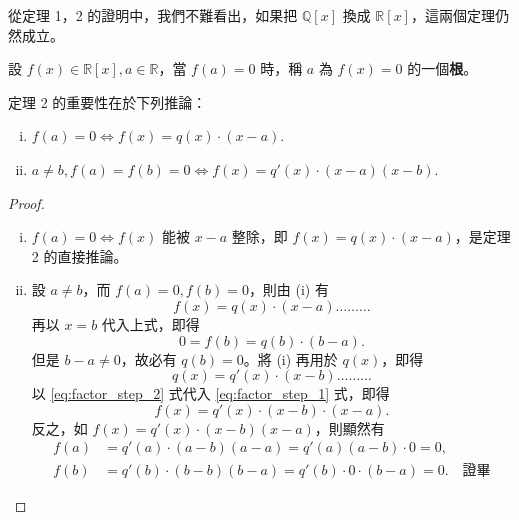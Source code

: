 從定理 1，2 的證明中，我們不難看出，如果把 $\mathbb{Q}[x]$ 換成 $\mathbb{R}[x]$，這兩個定理仍然成立。

\begin{definition*}
設 $f(x) \in \mathbb{R}[x], a \in \mathbb{R}$，當 $f(a)=0$ 時，稱 $a$ 為 $f(x)=0$ 的一個\textbf{根}。
\end{definition*}

定理 2 的重要性在於下列推論：

\begin{corollary}[因式定理]\label{cor:factor_thm}
\leavevmode
\begin{enumerate}[(i)]
  \item $f(a)=0 \iff f(x)=q(x) \cdot (x-a)$.
  \item $a \neq b, f(a)=f(b)=0 \iff f(x)=q'(x) \cdot (x-a)(x-b)$.
\end{enumerate}
\end{corollary}

\begin{proof}
\leavevmode
\begin{enumerate}[(i)]
  \item $f(a)=0 \iff f(x)$ 能被 $x-a$ 整除，即 $f(x)=q(x) \cdot (x-a)$，是定理 2 的直接推論。
  \item 設 $a \neq b$，而 $f(a)=0, f(b)=0$，則由 (i) 有
  \begin{equation}\label{eq:factor_step_1}
    f(x) = q(x) \cdot (x-a) \dots\dots\dots
  \end{equation}
  再以 $x=b$ 代入上式，即得
  \begin{equation*}
    0 = f(b) = q(b) \cdot (b-a).
  \end{equation*}
  但是 $b-a \neq 0$，故必有 $q(b)=0$。將 (i) 再用於 $q(x)$，即得
  \begin{equation}\label{eq:factor_step_2}
    q(x) = q'(x) \cdot (x-b) \dots\dots\dots
  \end{equation}
  以 \eqref{eq:factor_step_2} 式代入 \eqref{eq:factor_step_1} 式，即得
  \begin{equation*}
    f(x) = q'(x) \cdot (x-b) \cdot (x-a).
  \end{equation*}
  反之，如 $f(x)=q'(x) \cdot (x-b)(x-a)$，則顯然有
  \begin{align*}
    f(a) &= q'(a) \cdot (a-b)(a-a) = q'(a)(a-b) \cdot 0 = 0, \\
    f(b) &= q'(b) \cdot (b-b)(b-a) = q'(b) \cdot 0 \cdot (b-a) = 0. \quad \text{證畢}
  \end{align*}
\end{enumerate}
\end{proof}

